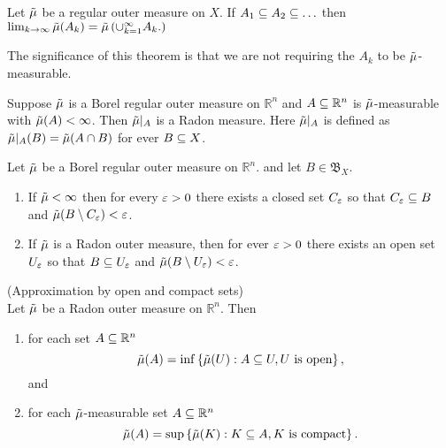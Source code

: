 \begin{thm}\cite[thm 2]{evans1991measure}
  Let $\tilde{\mu}$ be a regular outer measure on $X$. If $A_1\subseteq A_2 \subseteq \ldots$
  then $\lim_{k\to \infty}\tilde{\mu}(A_k) = \tilde{\mu}\left( \cup_{k=1}^\infty A_k.
  \right)$
\end{thm}

\begin{remark}
The significance of this theorem is that we are not requiring the $A_k$
to be $\tilde{\mu}$-measurable.
\end{remark}

\begin{thm}\cite[thm 3]{evans1991measure}
  Suppose $\tilde{\mu}$ is a Borel regular outer measure on $\mathbb{R}^n$ and $A\subseteq
  \mathbb{R}^n$ is $\tilde{\mu}$-measurable with $\tilde{\mu}(A)<\infty$. Then
  $\tilde{\mu}\rvert_A$ is a Radon measure. Here $\tilde{\mu}\rvert_A$ is defined as
  $\tilde{\mu}\rvert_A(B)= \tilde{\mu}(A\cap B)$ for ever $B\subseteq X$.
\end{thm}

\begin{lemma}\cite[lemma 1]{evans1991measure}
  Let $\tilde{\mu}$ be a Borel regular outer measure on $ \mathbb{R}^n$. and let
  $B\in \mathfrak{B}_X$.
  \begin{enumerate}
    \item If $\tilde{\mu} < \infty$ then for every $\varepsilon>0$ there exists a closed
      set $C_\varepsilon$ so that $C_\varepsilon \subseteq B$ and $\tilde{\mu}(B\setminus C_\varepsilon)<\varepsilon$.
    \item If $\tilde{\mu}$ is a Radon outer measure, then for ever $\varepsilon>0$ there
      exists an open set $U_\varepsilon$ so that $B\subseteq U_\varepsilon$ and
    $\tilde{\mu}(B\setminus U_\varepsilon)< \varepsilon$.
  \end{enumerate}
\end{lemma}

\begin{thm}\cite[thm 4]{evans1991measure}(Approximation by open and
  compact sets)\\
  Let $\tilde{\mu}$ be a Radon outer measure on $\mathbb{R}^n$. Then
  \begin{enumerate}
    \item for each set $A\subseteq \mathbb{R}^n$
      \begin{equation*}
        \tilde{\mu}(A) = \inf\left\{ \tilde{\mu}(U):A\subseteq U, U \text{ is open} \right\},
      \end{equation*}
      and
    \item for each $\tilde{\mu}$-measurable set $A\subseteq \mathbb{R}^n$
      \begin{equation*}
        \tilde{\mu}(A) = \sup\left\{ \tilde{\mu}(K):K\subseteq A, K \text{ is compact}
      \right\}.
      \end{equation*}
  \end{enumerate}
\end{thm}



